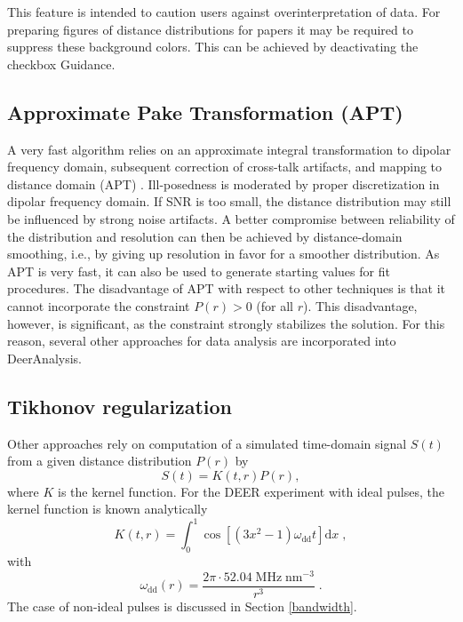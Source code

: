 \documentclass{article}
\begin{document}
This feature is intended to caution users against overinterpretation of data. For preparing figures of distance distributions for papers it may be required to suppress these background colors. This can be achieved by deactivating the checkbox {\ttfamily Guidance}.

\subsection{Approximate Pake Transformation (APT)}
A very fast algorithm relies on an approximate integral transformation to
dipolar frequency domain, subsequent correction of cross-talk artifacts, and
mapping to distance domain (APT) \cite{jeschke2001}. Ill-posedness is moderated by proper
discretization in dipolar frequency domain. If SNR is too small, the distance
distribution may still be influenced by strong noise artifacts. A better
compromise between reliability of the distribution and resolution can then be
achieved by distance-domain smoothing, i.e., by giving up resolution in favor
for a smoother distribution. As APT is very fast, it can also be used to generate
starting values for fit procedures. The disadvantage of APT with respect
to other techniques is that it cannot incorporate the constraint $P(r) > 0$ (for
all $r$). This disadvantage, however, is significant, as the constraint strongly
stabilizes the solution. For this reason, several other approaches for data analysis
are incorporated into DeerAnalysis.

\subsection{Tikhonov regularization}

Other approaches rely on computation of a simulated time-domain signal $S(t)$ from
a given distance distribution $P(r)$ by
\begin{equation}
	S \left( t \right) = K \left( t, r \right) P \left( r \right) ,
\end{equation}
where $K$ is the kernel function. For the DEER experiment with ideal pulses, the kernel function is known analytically
\begin{equation}
	K \left( t, r \right) = \int _0 ^1 \cos \left[ \left( 3x^2-1 \right) \omega_{\mathrm{dd}} t \right] \mathrm{d}x \; ,
	\label{eq:ideal_kernel}
\end{equation}
with
\begin{equation}
	\omega_{\mathrm{dd}} \left( r \right) = \frac{2 \pi \cdot 52.04 \; \mathrm{MHz} \; \mathrm{nm}^{-3}}{r^3} \; .
\end{equation}
The case of non-ideal pulses is discussed in Section \ref{bandwidth}.
\end{document}
